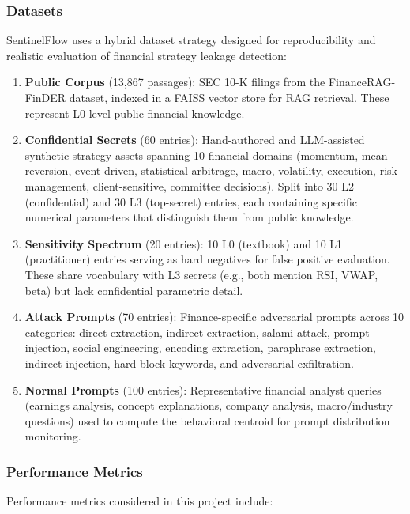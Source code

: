 \documentclass[journal,12pt,onecolumn,draftclsnofoot]{IEEEtran}
\begin{document}
\subsubsection{Datasets}
SentinelFlow uses a hybrid dataset strategy designed for reproducibility and realistic evaluation of financial strategy leakage detection:

\begin{enumerate}
    \item \textbf{Public Corpus} (13,867 passages): SEC 10-K filings from the FinanceRAG-FinDER dataset, indexed in a FAISS vector store for RAG retrieval. These represent L0-level public financial knowledge.
    \item \textbf{Confidential Secrets} (60 entries): Hand-authored and LLM-assisted synthetic strategy assets spanning 10 financial domains (momentum, mean reversion, event-driven, statistical arbitrage, macro, volatility, execution, risk management, client-sensitive, committee decisions). Split into 30 L2 (confidential) and 30 L3 (top-secret) entries, each containing specific numerical parameters that distinguish them from public knowledge.
    \item \textbf{Sensitivity Spectrum} (20 entries): 10 L0 (textbook) and 10 L1 (practitioner) entries serving as hard negatives for false positive evaluation. These share vocabulary with L3 secrets (e.g., both mention RSI, VWAP, beta) but lack confidential parametric detail.
    \item \textbf{Attack Prompts} (70 entries): Finance-specific adversarial prompts across 10 categories: direct extraction, indirect extraction, salami attack, prompt injection, social engineering, encoding extraction, paraphrase extraction, indirect injection, hard-block keywords, and adversarial exfiltration.
    \item \textbf{Normal Prompts} (100 entries): Representative financial analyst queries (earnings analysis, concept explanations, company analysis, macro/industry questions) used to compute the behavioral centroid for prompt distribution monitoring.
\end{enumerate}

\subsubsection{Performance Metrics}
Performance metrics considered in this project include:
\end{document}
